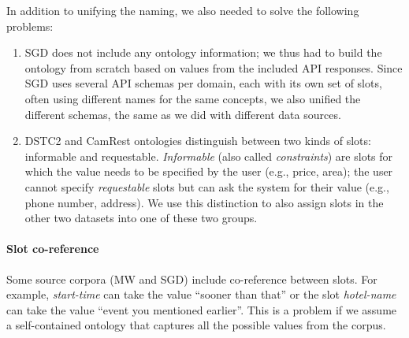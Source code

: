 In addition to unifying the naming, we also needed to solve the following problems:
\begin{enumerate}
    \item SGD does not include any ontology information; we thus had to build the ontology from scratch based on values from the included API responses. Since SGD uses several API schemas per domain, each with its own set of slots, often using different names for the same concepts, we also unified the different schemas, the same as we did with different data sources.

    \item DSTC2 and CamRest ontologies distinguish between two kinds of slots: informable and requestable. \emph{Informable} (also called \emph{constraints}) are slots for which the value needs to be specified by the user (e.g., price, area); the user cannot specify \emph{requestable} slots but can ask the system for their value (e.g., phone number, address). We use this distinction to also assign slots in the other two datasets into one of these two groups.

\end{enumerate}

\paragraph{Slot co-reference}
Some source corpora (MW and SGD) include co-reference between slots.
For example, \textit{start-time} can take the value “sooner than that” or the slot \emph{hotel-name} can take the value “event you mentioned earlier”.
This is a problem if we assume a self-contained ontology that captures all the possible values from the corpus.


